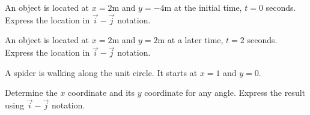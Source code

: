 
\begin{problem}
\item An object is located at $x=2$m and $y=-4$m at the initial time,
  $t=0$ seconds. Express the location in $\vec{i}-\vec{j}$ notation.
  \vfill
\item An object is located at $x=2$m and $y=2$m at a later time,
  $t=2$ seconds. Express the location in $\vec{i}-\vec{j}$ notation.
  \vfill
\item A spider is walking along the unit circle. It starts at $x=1$
  and $y=0$.

  \scalebox{0.35}{}

  Determine the $x$ coordinate and its $y$ coordinate for any
  angle. Express the result using $\vec{i}-\vec{j}$ notation.

  \vfill
\end{problem}



